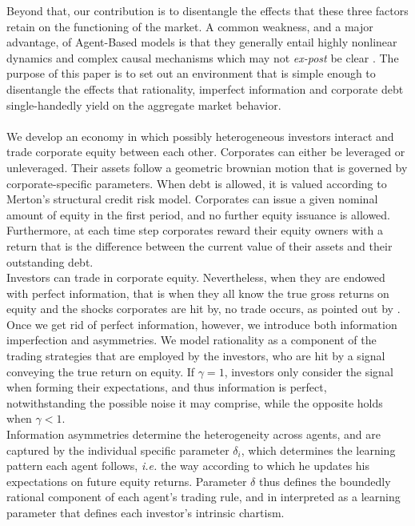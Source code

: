 \documentclass[11pt]{article}
\begin{document}
Beyond that, our contribution is to disentangle the effects that these three factors retain on the functioning of the market. A common weakness, and a major advantage, of Agent-Based models is that they generally entail highly nonlinear dynamics and complex causal mechanisms which may not \emph{ex-post} be clear \citep{20}. The purpose of this paper is to set out an environment that is simple enough to disentangle the effects that rationality, imperfect information and corporate debt single-handedly yield on the aggregate market behavior.\\\\
We develop an economy in which possibly heterogeneous investors interact and trade corporate equity between each other. Corporates can either be leveraged or unleveraged. Their assets follow a geometric brownian motion that is governed by corporate-specific parameters. When debt is allowed, it is valued according to Merton's structural credit risk model. Corporates can issue a given nominal amount of equity in the first period, and no further equity issuance is allowed. Furthermore, at each time step corporates reward their equity owners with a return that is the difference between the current value of their assets and their outstanding debt.\\
Investors can trade in corporate equity. Nevertheless, when they are endowed with perfect information, that is when they all know the true gross returns on equity and the shocks corporates are hit by, no trade occurs, as pointed out by \citet{6}. Once we get rid of perfect information, however, we introduce both information imperfection and asymmetries. We model rationality as a component of the trading strategies that are employed by the investors, who are hit by a signal conveying the true return on equity. If $\gamma=1$, investors only consider the signal when forming their expectations, and thus information is perfect, notwithstanding the possible noise it may comprise, while the opposite holds when $\gamma<1$.\\ Information asymmetries determine the heterogeneity across agents, and are captured by the individual specific parameter $\delta_i$, which determines the learning pattern each agent follows, \emph{i.e.} the way according to which he updates his expectations on future equity returns. Parameter $\delta$ thus defines the boundedly rational component of each agent's trading rule, and in interpreted as a learning parameter that defines each investor's intrinsic chartism.\\
\end{document}
